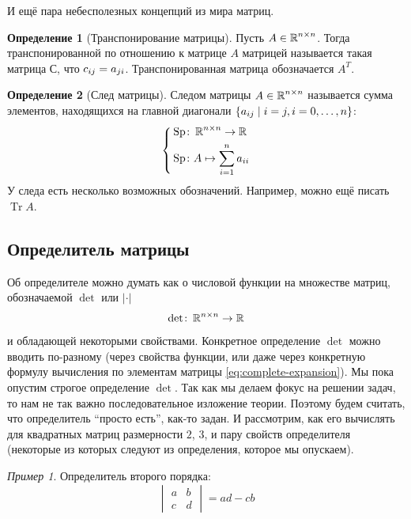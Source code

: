 \documentclass[a4paper,12pt]{article}
\theoremstyle{definition}
\newtheorem{definition}{Определение}[section]
\theoremstyle{remark}
\newtheorem*{example}{Пример}
\theoremstyle{remark}
\DeclareMathOperator{\Sp}{Sp}
\DeclareMathOperator{\Tr}{Tr}
\begin{document}
  И ещё пара небесполезных концепций из мира матриц.
  
  \begin{definition}[Транспонирование матрицы]
    Пусть $A \in \operatorname{\mathbb R}^{n \times n}$.
    Тогда транспонированной по отношению к матрице $A$ матрицей называется такая матрица $С$, что
    $c_{ij} \hm= a_{ji}$.
    Транспонированная матрица обозначается $A^T$.
  \end{definition}
  
  \begin{definition}[След матрицы]
    Следом матрицы $A \in \operatorname{\mathbb R}^{n \times n}$ называется сумма элементов, находящихся на главной диагонали $\{a_{ij} \hm\mid i = j, i = 0, \ldots, n\}$:
    \[
      \left\{
        \begin{aligned}
          &\Sp \colon \RR^{n \times n} \to \RR\\
          &\Sp \colon A \mapsto \sum_{i = 1}^n a_{ii}
        \end{aligned}
      \right.
    \]
    У следа есть несколько возможных обозначений.
    Например, можно ещё писать $\Tr A$.
  \end{definition}


  \subsection{Определитель матрицы}
  
  Об определителе можно думать как о числовой функции на множестве матриц, обозначаемой $\det$ или $|\cdot|$
  \[
    \det \colon \operatorname{\mathbb R}^{n\times n} \to \operatorname{\mathbb R}
  \]
  и обладающей некоторыми свойствами.
  Конкретное определение $\det$ можно вводить по-разному (через свойства функции, или даже через конкретную формулу вычисления по элементам матрицы \ref{eq:complete-expansion}).
  Мы пока опустим строгое определение $\det$.
  Так как мы делаем фокус на решении задач, то нам не так важно последовательное изложение теории.
  Поэтому будем считать, что определитель ``просто есть'', как-то задан.
  И рассмотрим, как его вычислять для квадратных матриц размерности $2$, $3$, и пару свойств определителя (некоторые из которых следуют из определения, которое мы опускаем).
  
  \begin{example}
    Определитель второго порядка:
    \[
      \begin{vmatrix}
        a & b\\
        c & d
      \end{vmatrix} = ad - cb
    \]
  \end{example}
\end{document}
